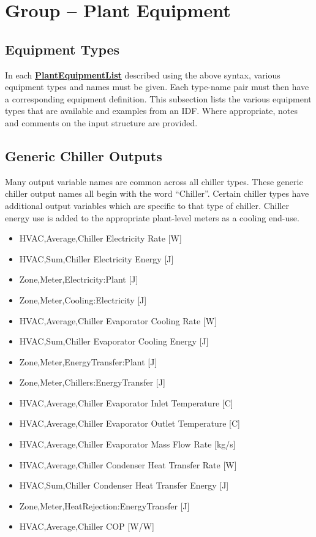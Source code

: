 \section{Group -- Plant Equipment}\label{group-plant-equipment}

\subsection{Equipment Types}\label{equipment-types-000}

In each \textbf{\hyperref[plantequipmentlist]{PlantEquipmentList}} described using the above syntax, various equipment types and names must be given. Each type-name pair must then have a corresponding equipment definition. This subsection lists the various equipment types that are available and examples from an IDF. Where appropriate, notes and comments on the input structure are provided.

\subsection{Generic Chiller Outputs}\label{generic-chiller-outputs}

Many output variable names are common across all chiller types. These generic chiller output names all begin with the word ``Chiller''. Certain chiller types have additional output variables which are specific to that type of chiller. Chiller energy use is added to the appropriate plant-level meters as a cooling end-use.

\begin{itemize}
\item
  HVAC,Average,Chiller Electricity Rate {[}W{]}
\item
  HVAC,Sum,Chiller Electricity Energy {[}J{]}
\item
  Zone,Meter,Electricity:Plant {[}J{]}
\item
  Zone,Meter,Cooling:Electricity {[}J{]}
\item
  HVAC,Average,Chiller Evaporator Cooling Rate {[}W{]}
\item
  HVAC,Sum,Chiller Evaporator Cooling Energy {[}J{]}
\item
  Zone,Meter,EnergyTransfer:Plant {[}J{]}
\item
  Zone,Meter,Chillers:EnergyTransfer {[}J{]}
\item
  HVAC,Average,Chiller Evaporator Inlet Temperature {[}C{]}
\item
  HVAC,Average,Chiller Evaporator Outlet Temperature {[}C{]}
\item
  HVAC,Average,Chiller Evaporator Mass Flow Rate {[}kg/s{]}
\item
  HVAC,Average,Chiller Condenser Heat Transfer Rate {[}W{]}
\item
  HVAC,Sum,Chiller Condenser Heat Transfer Energy {[}J{]}
\item
  Zone,Meter,HeatRejection:EnergyTransfer {[}J{]}
\item
  HVAC,Average,Chiller COP {[}W/W{]}
\end{itemize}

